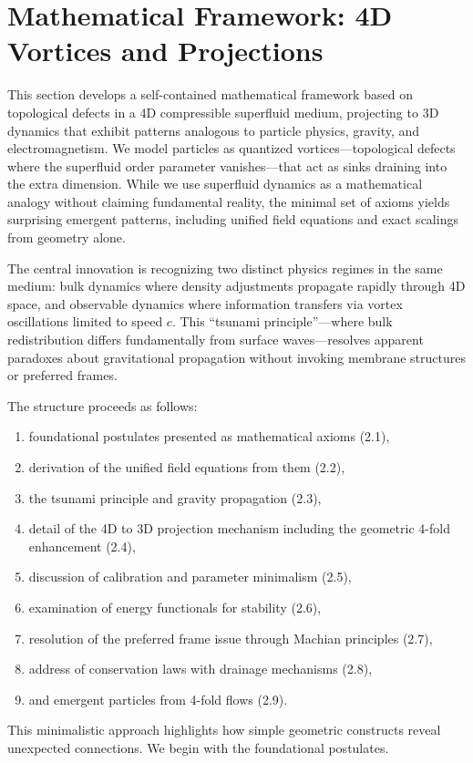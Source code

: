\section{Mathematical Framework: 4D Vortices and Projections}

This section develops a self-contained mathematical framework based on topological defects in a 4D compressible superfluid medium, projecting to 3D dynamics that exhibit patterns analogous to particle physics, gravity, and electromagnetism. We model particles as quantized vortices---topological defects where the superfluid order parameter vanishes---that act as sinks draining into the extra dimension. While we use superfluid dynamics as a mathematical analogy without claiming fundamental reality, the minimal set of axioms yields surprising emergent patterns, including unified field equations and exact scalings from geometry alone.

The central innovation is recognizing two distinct physics regimes in the same medium: bulk dynamics where density adjustments propagate rapidly through 4D space, and observable dynamics where information transfers via vortex oscillations limited to speed $c$. This ``tsunami principle''---where bulk redistribution differs fundamentally from surface waves---resolves apparent paradoxes about gravitational propagation without invoking membrane structures or preferred frames.

The structure proceeds as follows:
\begin{enumerate}
\item foundational postulates presented as mathematical axioms (2.1),
\item derivation of the unified field equations from them (2.2),
\item the tsunami principle and gravity propagation (2.3),
\item detail of the 4D to 3D projection mechanism including the geometric 4-fold enhancement (2.4),
\item discussion of calibration and parameter minimalism (2.5),
\item examination of energy functionals for stability (2.6),
\item resolution of the preferred frame issue through Machian principles (2.7),
\item address of conservation laws with drainage mechanisms (2.8),
\item and emergent particles from 4-fold flows (2.9).
\end{enumerate}
This minimalistic approach highlights how simple geometric constructs reveal unexpected connections. We begin with the foundational postulates.


